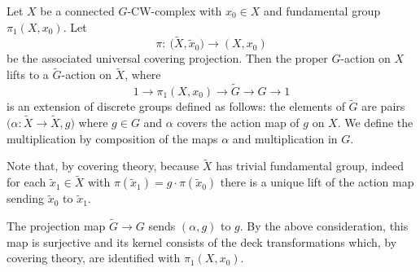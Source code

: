 \documentclass[11pt]{article}
\numberwithin{equation}{section}
\numberwithin{equation}{section}
\begin{document}
Let $X$ be a connected $G$-CW-complex with $x_0\in X$ and fundamental group
	$\pi_1(X,x_0)$. Let
	\begin{equation*}
		\pi\colon\ \bigl(\tilde{X},\tilde x_0\bigr)\to (X,x_0)
	\end{equation*}
	be the
	associated universal covering projection. Then the
	proper $G$-action on $X$ lifts to a $\widetilde{G}$-action on $\tilde{X}$,
	where
	\begin{equation*}
		1\to\pi_1(X,x_0)\to \widetilde{G}\to G\to 1
	\end{equation*}
	is an extension of
	discrete groups
	defined as follows: the elements of $\widetilde{G}$ are pairs
	$\bigl(\alpha\colon\tilde X\to\tilde X,g\bigr)$ where $g\in G$ and $\alpha$ covers the
	action map of $g$ on $X$. We define the multiplication by composition of the
	maps $\alpha$ and
	multiplication in $G$.
	
	Note that, by covering theory, because $\tilde X$
	has trivial fundamental group, indeed for each $\tilde x_1\in\tilde X$ with
	$\pi(\tilde x_1)=g\cdot \pi(\tilde x_0)$
	there is a unique lift of the action map sending $\tilde x_0$ to $\tilde
	x_1$.
	
	The projection map $\widetilde{G}\to G$ sends $(\alpha,g)$ to $g$. By
	the above consideration, this map is surjective and its kernel consists of
	the deck transformations which, by covering theory, are identified with
	$\pi_1(X,x_0)$.
	
\end{document}
